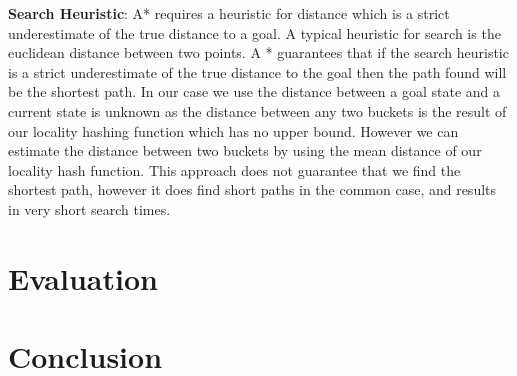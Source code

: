 \textbf{Search Heuristic}: A* requires a heuristic for
distance which is a strict underestimate of the true
distance to a goal. A typical heuristic for search is the
euclidean distance between two points. A * guarantees that
if the search heuristic is a strict underestimate of the
true distance to the goal then the path found will be the
shortest path. In our case we use the distance between a
goal state and a current state is unknown as the distance
between any two buckets is the result of our locality
hashing function which has no upper bound. However we can
estimate the distance between two buckets by using the mean
distance of our locality hash function. This approach does
not guarantee that we find the shortest path, however it
does find short paths in the common case, and results in
very short search times.


\section{Evaluation}
\label{sec:eval}

\section{Conclusion}
\label{sec:conclusion}
